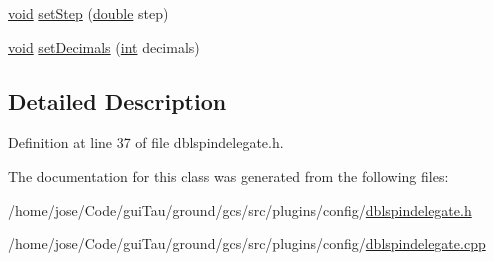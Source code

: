 \begin{DoxyCompactItemize}
\item 
\hyperlink{group___u_a_v_objects_plugin_ga444cf2ff3f0ecbe028adce838d373f5c}{void} \hyperlink{group___config_plugin_ga42edf13270f2e0292e3a4c41d7e3a1ca}{set\-Step} (\hyperlink{_super_l_u_support_8h_a8956b2b9f49bf918deed98379d159ca7}{double} step)
\item 
\hyperlink{group___u_a_v_objects_plugin_ga444cf2ff3f0ecbe028adce838d373f5c}{void} \hyperlink{group___config_plugin_ga11e87a1f2a87beb99eff9abd3ed39c70}{set\-Decimals} (\hyperlink{ioapi_8h_a787fa3cf048117ba7123753c1e74fcd6}{int} decimals)
\end{DoxyCompactItemize}


\subsection{Detailed Description}


Definition at line 37 of file dblspindelegate.\-h.



The documentation for this class was generated from the following files\-:\begin{DoxyCompactItemize}
\item 
/home/jose/\-Code/gui\-Tau/ground/gcs/src/plugins/config/\hyperlink{dblspindelegate_8h}{dblspindelegate.\-h}\item 
/home/jose/\-Code/gui\-Tau/ground/gcs/src/plugins/config/\hyperlink{dblspindelegate_8cpp}{dblspindelegate.\-cpp}\end{DoxyCompactItemize}
